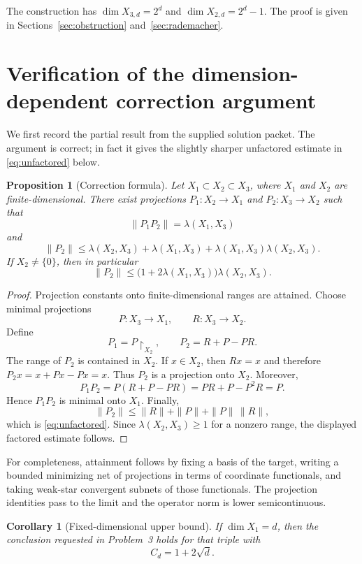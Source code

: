 \documentclass[11pt]{article}
\newtheorem{proposition}[theorem]{Proposition}
\newtheorem{corollary}[theorem]{Corollary}
\theoremstyle{remark}
\newcommand{\restr}[2]{#1\!\restriction_{#2}}
\begin{document}
The construction has $\dim X_{3,d}=2^d$ and
$\dim X_{2,d}=2^d-1$.  The proof is given in Sections~\ref{sec:obstruction}
and~\ref{sec:rademacher}.

\section{Verification of the dimension-dependent correction argument}
\label{sec:correction}

We first record the partial result from the supplied solution packet.  The
argument is correct; in fact it gives the slightly sharper unfactored estimate
in \eqref{eq:unfactored} below.

\begin{proposition}[Correction formula]\label{prop:correction}
Let $X_1\subset X_2\subset X_3$, where $X_1$ and $X_2$ are
finite-dimensional.  There exist projections $P_1:X_2\to X_1$ and
$P_2:X_3\to X_2$ such that
\[
 \|P_1P_2\|=\lambda(X_1,X_3)
\]
and
\begin{equation}\label{eq:unfactored}
 \|P_2\|\leq \lambda(X_2,X_3)+\lambda(X_1,X_3)
       +\lambda(X_1,X_3)\lambda(X_2,X_3).
\end{equation}
If $X_2\neq\{0\}$, then in particular
\[
 \|P_2\|\leq
 \bigl(1+2\lambda(X_1,X_3)\bigr)\lambda(X_2,X_3).
\]
\end{proposition}

\begin{proof}
Projection constants onto finite-dimensional ranges are attained.  Choose
minimal projections
\[
 P:X_3\to X_1,\qquad R:X_3\to X_2.
\]
Define
\[
 P_1=\restr{P}{X_2},\qquad P_2=R+P-PR.
\]
The range of $P_2$ is contained in $X_2$.  If $x\in X_2$, then $Rx=x$ and
therefore $P_2x=x+Px-Px=x$.  Thus $P_2$ is a projection onto $X_2$.
Moreover,
\[
 P_1P_2=P(R+P-PR)=PR+P-P^2R=P.
\]
Hence $P_1P_2$ is minimal onto $X_1$.  Finally,
\[
 \|P_2\|\leq \|R\|+\|P\|+\|P\|\,\|R\|,
\]
which is \eqref{eq:unfactored}.  Since $\lambda(X_2,X_3)\geq 1$ for a
nonzero range, the displayed factored estimate follows.
\end{proof}

For completeness, attainment follows by fixing a basis of the target, writing
a bounded minimizing net of projections in terms of coordinate functionals,
and taking weak-star convergent subnets of those functionals.  The projection
identities pass to the limit and the operator norm is lower semicontinuous.

\begin{corollary}[Fixed-dimensional upper bound]\label{cor:upper}
If $\dim X_1=d$, then the conclusion requested in Problem~3 holds for that
triple with
\[
        C_d=1+2\sqrt d.
\]
\end{corollary}
\end{document}

